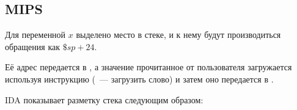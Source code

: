 \subsection{MIPS}

Для переменной $x$ выделено место в стеке, и к нему будут производиться обращения как $\$sp+24$.

Её адрес передается в \scanf, а значение прочитанное от пользователя загружается используя 
инструкцию  (~--- загрузить слово) и затем оно передается в \printf.



IDA показывает разметку стека следующим образом:



